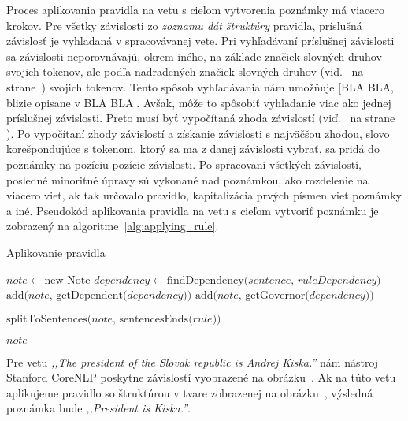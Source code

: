 Proces aplikovania pravidla na vetu s cieľom vytvorenia poznámky má viacero krokov. Pre všetky závislosti zo \textit{zoznamu dát štruktúry} pravidla, príslušná závislosť je vyhľadaná v spracovávanej vete. Pri vyhľadávaní príslušnej závislosti sa závislosti neporovnávajú, okrem iného, na základe značiek slovných druhov svojich tokenov, ale podľa nadradených značiek slovných druhov (viď.~ na strane~\pageref{paragraph:superior_pos_tag}) svojich tokenov. Tento spôsob vyhľadávania nám umožňuje [BLA BLA, blizie opisane v BLA BLA]. Avšak, môže to spôsobiť vyhľadanie viac ako jednej príslušnej závislosti. Preto musí byť vypočítaná zhoda závislostí (viď.~ na strane \pageref{paragraph:dependency_match}). Po vypočítaní zhody závislostí a získanie závislosti s najväčšou zhodou, slovo korešpondujúce s tokenom, ktorý sa ma z danej závislosti vybrať, sa pridá do poznámky na pozíciu pozície závislosti. Po spracovaní všetkých závislostí, posledné minoritné úpravy sú vykonané nad poznámkou, ako rozdelenie na viacero viet, ak tak určovalo pravidlo, kapitalizácia prvých písmen viet poznámky a iné. Pseudokód aplikovania pravidla na vetu s cieľom vytvoriť poznámku je zobrazený na algoritme~\ref{alg:applying_rule}.

\begin{algorithm}
	\caption[Aplikovanie pravidla]{Aplikovanie pravidla}\label{alg:applying_rule}
	\begin{algorithmic}[1]
		\State $note \gets \text{new Note}$
		\State $dependency \gets \text{findDependency(} sentence \text{, } ruleDependency \text{)}$
		\State $\text{add(} note \text{, getDependent(} dependency \text{))}$
		\State $\text{add(} note \text{, getGovernor(} dependency \text{))}$
		\EndIf
		\EndIf
		\EndFor
		
		\State $\text{splitToSentences(} note \text{, sentencesEnds(} rule \text{))}$	
		
		\Return $note$
		\EndProcedure
	\end{algorithmic}
\end{algorithm}

Pre vetu \textit{,,The president of the Slovak republic is Andrej Kiska.''} nám nástroj Stanford CoreNLP poskytne závislostí vyobrazené na obrázku~. Ak na túto vetu aplikujeme pravidlo so štruktúrou v tvare zobrazenej na obrázku~, výsledná poznámka bude \textit{,,President is Kiska.''}. 

